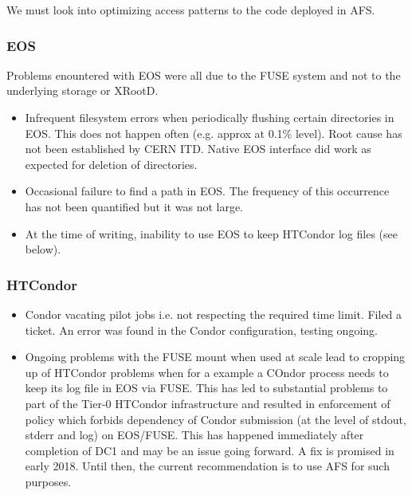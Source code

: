 \documentclass[pdftex,12pt,letter]{article}
\begin{document}
We must look into optimizing access patterns to the code deployed in AFS.

\subsubsection{EOS}
Problems enountered with EOS were all due to the FUSE system and not to the underlying storage or XRootD.

\begin{itemize}

\item Infrequent filesystem errors when periodically flushing certain directories in EOS. This does not happen often (e.g. approx at 0.1\% level).
Root cause has not been established by CERN ITD. Native EOS interface did work as expected for deletion of directories.

\item Occasional failure to find a path in EOS. The frequency of this occurrence has not been quantified but it was not large.

\item At the time of writing, inability to use EOS to keep HTCondor log files (see below).

\end{itemize}



\subsubsection{HTCondor}
\begin{itemize}

\item Condor vacating pilot jobs i.e. not respecting the required time limit. Filed a ticket. An error was found in the Condor configuration, testing ongoing.

\item Ongoing problems with the FUSE mount when used at scale lead to cropping up of HTCondor problems when for a example a COndor
process needs to keep its log file in EOS via FUSE. This has led to substantial problems to part of the Tier-0 HTCondor infrastructure and
resulted in enforcement of policy which forbids dependency of Condor submission (at the level of stdout, stderr and log) on EOS/FUSE.
This has happened immediately after completion of DC1 and may be an issue going forward. A fix is promised in early 2018. Until then,
the current recommendation is to use AFS for such purposes.

\end{itemize}
\end{document}
